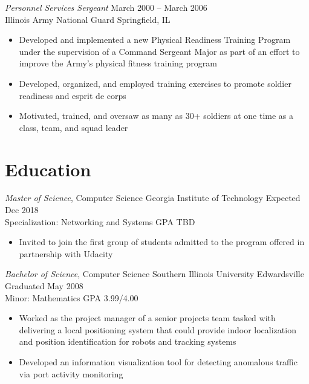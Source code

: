 \documentclass[margin,line]{resume}
\begin{document}
\begin{resume}
{\sl Personnel Services Sergeant}   \hfill   March 2000 -- March 2006\\
Illinois Army National Guard        \hfill   Springfield, IL
\begin{itemize} \itemsep -2pt %
\small\item Developed and implemented a new Physical Readiness Training Program under the supervision of a
            Command Sergeant Major as part of an effort to improve the Army's physical fitness training program
\small\item Developed, organized, and employed training exercises to promote soldier readiness and esprit de corps
\small\item Motivated, trained, and oversaw as many as 30+ soldiers at one time as a class, team, and squad leader
\end{itemize}

\section{Education}
{\small
  {\sl Master of Science}, Computer Science \hfill
  Georgia Institute of Technology\hfill
  Expected Dec 2018\\
  Specialization: Networking and Systems \hfill
  GPA TBD%
}
\begin{itemize} \itemsep -2pt %
\small\item Invited to join the first group of students admitted to the program offered in partnership with Udacity
\end{itemize}

{\small
  {\sl Bachelor of Science}, Computer Science \hfill
  Southern Illinois University Edwardsville   \hfill
  Graduated May 2008\\
  Minor: Mathematics \hfill
  GPA 3.99/4.00
}
\begin{itemize} \itemsep -2pt %
\small\item Worked as the project manager of a senior projects team tasked with delivering a local positioning
            system that could provide indoor localization and position identification for robots and tracking systems
\small\item Developed an information visualization tool for detecting anomalous traffic via port activity monitoring
\end{itemize}


\end{resume}
\end{document}
